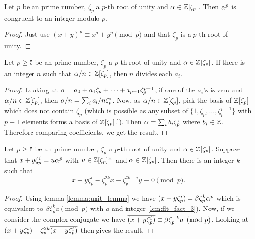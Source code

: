 \begin{lemma}\label{lem:flt_fact_3}
	
	 	Let $p$ be an prime number, $\zeta_p$ a $p$-th root of unity and $\alpha \in \mathbb{Z}[\zeta_p]$. Then $\alpha^p$ is congruent to an integer modulo $p$.
\end{lemma}

\begin{proof}
	  Just use $(x+y)^p \equiv x^p + y^p \pmod p$ and that $\zeta_p$ is a $p$-th root of unity.
\end{proof}

\begin{lemma}\label{lem:flt_fact_4}
	Let $p \geq 5$ be an prime number, $\zeta_p$ a $p$-th root of unity and $ \alpha \in \mathbb{Z}[\zeta_p]$. If there is an integer $n$ such that $\alpha/n \in \mathbb{Z}[\zeta_p]$, then $n$ divides each $a_i$.
\end{lemma}

\begin{proof}
	 Looking at $\alpha=a_0+a_1\zeta_p+\cdots+a_{p-1}\zeta_p^{p-1}$, if one of the $a_i$'s is zero and $\alpha/n \in \mathbb{Z}[\zeta_p]$, then $\alpha/n=\sum_i a_i/n \zeta_p^i$. Now, as $\alpha/n \in \mathbb{Z}[\zeta_p]$, pick the basis of $\mathbb{Z}[\zeta_p]$ which does not contain $\zeta_p$ (which is possible as any subset of $\{1,\zeta_p,\dots,\zeta_p^{p-1}\}$ with $p-1$ elements forms a basis of $\mathbb{Z}[\zeta_p]$.]). Then $\alpha=\sum_i b_i \zeta_p^i$ where $b_i \in \mathbb{Z}$. Therefore comparing coefficients, we get the result.
\end{proof}

\begin{lemma}\label{lem:flt_fact_5}
	Let $p \geq 5$ be an prime number, $\zeta_p$ a $p$-th root of unity and $ \alpha \in \mathbb{Z}[\zeta_p]$.  Suppose that $x+y\zeta_p^i=u \alpha^p$ with $u \in \mathbb{Z}[\zeta_p]^\times$ and $\alpha \in \mathbb{Z}[\zeta_p]$. Then there is an integer $k$ such that \[x+y\zeta_p^i-\zeta_p^{2k}x-\zeta_p^{2k-i}y \equiv 0 \pmod p.\]
\end{lemma}

\begin{proof}
 Using lemma \ref{lemma:unit_lemma} we have $(x+y\zeta_p^i) =\beta \zeta_p^k \alpha^p$ which is equivalent to $\beta \zeta_p^k a \pmod p$ with $a$ and integer \ref{lem:flt_fact_3}). Now, if we consider the complex conjugate we have $\overline{(x+y\zeta_p^i)  }\equiv \beta \zeta_p^{-k}a \pmod p$. Looking at $(x+y\zeta_p^i)-\zeta_p^{2k}\overline{(x+y\zeta_p^i)  }$ then gives the result.


\end{proof}


